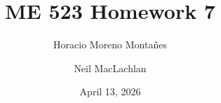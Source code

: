 

\title{ME 523 Homework 7}
\author{Horacio Moreno Monta\~nes \and Neil MacLachlan}
\date{April 13, 2026} %


\maketitle




\pagebreak



\pagebreak




